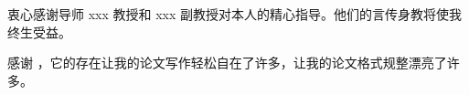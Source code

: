 

\begin{ack}
  衷心感谢导师 xxx 教授和 xxx 副教授对本人的精心指导。他们的言传身教将使我终生受益。

  感谢 \nudtpaper{}，它的存在让我的论文写作轻松自在了许多，让我的论文格式规整漂亮了许多。

\end{ack}
